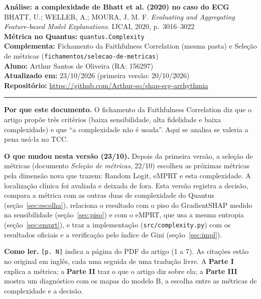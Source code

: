 \documentclass[11pt,a4paper]{article}
\begin{document}
\begin{center}
    {\LARGE \textbf{Análise: a complexidade de Bhatt et al. (2020) no caso do ECG}} \\[0.35em]
    {\large BHATT, U.; WELLER, A.; MOURA, J. M. F. \textit{Evaluating and Aggregating Feature-based Model Explanations}. IJCAI, 2020, p.~3016--3022} \\[0.3em]
    \textbf{Métrica no Quantus:} \texttt{quantus.Complexity} \\[0.2em]
    \textbf{Complementa:} Fichamento da Faithfulness Correlation (mesma pasta) e Seleção de métricas (\texttt{fichamentos/selecao-de-metricas}) \\[0.2em]
    \textbf{Aluno:} Arthur Santos de Oliveira (RA: 156297) \\[0.2em]
    \textbf{Atualizado em:} 23/10/2026 (primeira versão: 20/10/2026) \\[0.2em]
    \textbf{Repositório:} \url{https://github.com/Arthur-so/shap-ecg-arrhythmia}
\end{center}
\vspace{-0.5em}
\hrule
\vspace{0.8em}

\textbf{Por que este documento.} O fichamento da Faithfulness Correlation diz que o artigo propõe três critérios (baixa sensibilidade, alta fidelidade e baixa complexidade) e que “a complexidade não é usada”. Aqui se analisa se valeria a pena usá-la no TCC.

\textbf{O que mudou nesta versão (23/10).} Depois da primeira versão, a seleção de métricas (documento \textit{Seleção de métricas}, 22/10) escolheu as próximas métricas pela dimensão nova que trazem: Random Logit, eMPRT e esta complexidade. A localização clínica foi avaliada e deixada de fora. Esta versão registra a decisão, compara a métrica com as outras duas de complexidade do Quantus (seção~\ref{sec:escolha}), relaciona o resultado com o piso do GradientSHAP medido na sensibilidade (seção~\ref{sec:piso}) e com o eMPRT, que usa a mesma entropia (seção~\ref{sec:emprt}), e traz a implementação (\texttt{src/complexity.py}) com os resultados oficiais e a verificação pelo índice de Gini (seção~\ref{sec:impl}).

\textbf{Como ler.} \texttt{[p. N]} indica a página do PDF do artigo (1 a 7). As citações estão no original em inglês, cada uma seguida de uma tradução livre. A \textbf{Parte I} explica a métrica; a \textbf{Parte II} traz o que o artigo diz sobre ela; a \textbf{Parte III} mostra um diagnóstico com os mapas do modelo B, a escolha entre as métricas de complexidade e a decisão.
\end{document}
